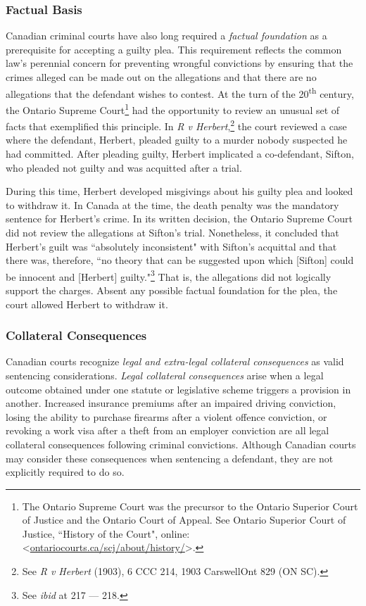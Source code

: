 \subsubsection{Factual Basis}

Canadian criminal courts have also long required a \textit{factual foundation} as a prerequisite for accepting a guilty plea. This requirement reflects the common law's perennial concern for preventing wrongful convictions by ensuring that the crimes alleged can be made out on the allegations and that there are no allegations that the defendant wishes to contest. At the turn of the 20\textsuperscript{th} century, the Ontario Supreme Court\footnote{The Ontario Supreme Court was the precursor to the Ontario Superior Court of Justice and the Ontario Court of Appeal. See Ontario Superior Court of Justice, ``History of the Court", online: \textless \url{ontariocourts.ca/scj/about/history/}\textgreater.} had the opportunity to review an unusual set of facts that exemplified this principle. In \textit{R v Herbert},\footnote{See \textit{R v Herbert} (1903), 6 CCC 214, 1903 CarswellOnt 829 (ON SC).} the court reviewed a case where the defendant, Herbert, pleaded guilty to a murder nobody suspected he had committed. After pleading guilty, Herbert implicated a co-defendant, Sifton, who pleaded not guilty and was acquitted after a trial. 

During this time, Herbert developed misgivings about his guilty plea and looked to withdraw it. In Canada at the time, the death penalty was the mandatory sentence for Herbert's crime. In its written decision, the Ontario Supreme Court did not review the allegations at Sifton's trial. Nonetheless, it concluded that Herbert's guilt was ``absolutely inconsistent" with Sifton's acquittal and that there was, therefore, ``no theory that can be suggested upon which [Sifton] could be innocent and [Herbert] guilty."\footnote{See \textit{ibid} at 217 — 218.} That is, the allegations did not logically support the charges. Absent any possible factual foundation for the plea, the court allowed Herbert to withdraw it.

\subsubsection{Collateral Consequences}

Canadian courts recognize \textit{legal and extra-legal collateral consequences} as valid sentencing considerations. \textit{Legal collateral consequences} arise when a legal outcome obtained under one statute or legislative scheme triggers a provision in another. Increased insurance premiums after an impaired driving conviction, losing the ability to purchase firearms after a violent offence conviction, or revoking a work visa after a theft from an employer conviction are all legal collateral consequences following criminal convictions. Although Canadian courts may consider these consequences when sentencing a defendant, they are not explicitly required to do so. 

